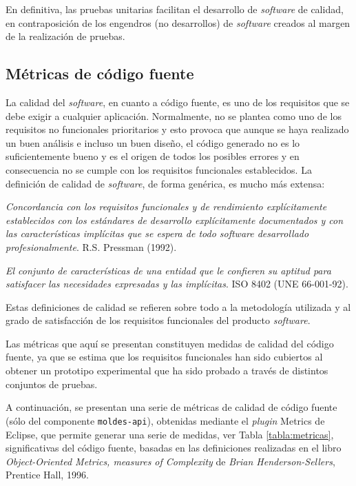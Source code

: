 En definitiva, las pruebas unitarias facilitan el desarrollo de \textit{software} de
calidad, en contraposición de los engendros (no desarrollos) de \textit{software} creados
al margen de la realización de pruebas.

\subsection{Métricas de código fuente}
La calidad del \textit{software}, en cuanto a código fuente, es uno de los requisitos que se
debe exigir a cualquier aplicación. Normalmente, no se plantea como uno de los
requisitos no funcionales prioritarios y esto provoca que aunque se haya
realizado un buen análisis e incluso un buen diseño, el código generado no es lo suficientemente bueno y es el
origen de todos los posibles errores y en consecuencia no se cumple con los
requisitos funcionales establecidos. La definición de calidad de \textit{software}, de
forma genérica, es mucho más extensa:  

\begin{Frame}
\textit{Concordancia con los requisitos funcionales y de
rendimiento explícitamente establecidos con los estándares de desarrollo
explícitamente documentados y con las características implícitas
que se espera de todo software desarrollado profesionalmente}. R.S. Pressman (1992).
\end{Frame}

\begin{Frame}
\textit{El conjunto de características de una entidad que le confieren su
aptitud para satisfacer las necesidades expresadas y las implícitas}. \gls{ISO} 8402
(\gls{UNE} 66-001-92).
\end{Frame}

Estas definiciones de calidad se refieren sobre todo a la metodología utilizada y
al grado de satisfacción de los requisitos funcionales del producto \textit{software}. 

Las métricas que aquí se presentan constituyen medidas de calidad del código fuente, ya
que se estima que los requisitos funcionales han sido cubiertos al obtener un
prototipo experimental que ha sido probado a través de distintos conjuntos de pruebas.

A continuación, se presentan una serie de métricas de calidad de código fuente
(sólo del componente \texttt{moldes-api}), obtenidas mediante el \textit{plugin} Metrics de Eclipse, que 
permite generar una serie de medidas, ver Tabla \ref{tabla:metricas}, significativas del código fuente, basadas en 
las definiciones realizadas en el libro \textit{Object-Oriented Metrics, measures of Complexity} de \textit{Brian Henderson-Sellers}, Prentice Hall, 1996. 

